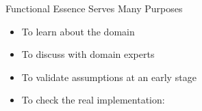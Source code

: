 \begin{frame}[fragile]{Functional Essence Serves Many Purposes}

\begin{itemize}[<+->]
\item To learn about the domain
\item To discuss with domain experts
\item To validate assumptions at an early stage

\vspace{1em}

\item To check the real implementation:
\end{itemize}

\end{frame}



